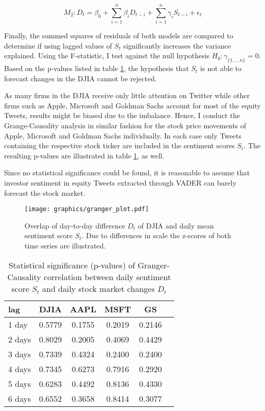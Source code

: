 \documentclass[a4paper,12pt]{article}%
\begin{document}
\begin{equation}
M_2: D_t = \beta_0 + \sum_{i=1}^n \beta_i D_{t-i} + \sum_{i=1}^n \gamma_i S_{t-i} + \epsilon_t
\end{equation}

Finally, the summed squares of residuals of both models are compared to determine if using lagged values of $S_t$ significantly increases the variance explained. Using the F-statistic, I test against the null hypothesis $H_0: \gamma_{\{1,..,n\}} = 0$. Based on the p-values listed in table \ref{table:granger}, the hypothesis that $S_t$ is not able to forecast changes in the DJIA cannot be rejected. 

 As many firms in the DJIA receive only little attention on Twitter while other firms such as Apple, Microsoft and Goldman Sachs account for most of the equity Tweets, results might be biased due to the imbalance. Hence, I conduct the Grange-Causality analysis in similar fashion for the stock price movements of Apple, Microsoft and Goldman Sachs individually. In each case only Tweets containing the respective stock ticker are included in the sentiment scores $S_t$. The resulting p-values are illustrated in table \ref{table:granger}, as well.

Since no statistical significance could be found, it is reasonable to assume that investor sentiment in equity Tweets extracted through VADER can barely forecast the stock market. 

\begin{figure}
\captionsetup{justification=centering}
\centering
\texttt{[image: graphics/granger\_plot.pdf]}
\caption{Overlap of day-to-day difference $D_t$ of DJIA and daily mean sentiment score $S_t$. Due to differences in scale the z-scores of both time series are illustrated. \label{fig:comp_momentum_adadelta}}
\end{figure}

\begin{table}
\centering
\captionsetup{justification=centering}
\begin{tabular}{l|c c c c c}
\hline
lag & DJIA & AAPL & MSFT & GS \\ \hline
1 day  & 0.5779  & 0.1755 & 0.2019 & 0.2146 \\ 
2 days  & 0.8029 & 0.2005 & 0.4069  & 0.4429 \\ 
3 days  & 0.7339 & 0.4324 & 0.2400 & 0.2400 \\ 
4 days  & 0.7345 & 0.6273 & 0.7916 & 0.2920 \\ 
5 days  & 0.6283 & 0.4492 & 0.8136 & 0.4330 \\ 
6 days  & 0.6552 & 0.3658 & 0.8414 & 0.3077 \\ \hline

\end{tabular}
\caption{Statistical significance (p-values) of Granger-Causality correlation between daily sentiment score $S_t$ and daily stock market changes $D_t$ \label{table:granger}}
\end{table}
\end{document}
